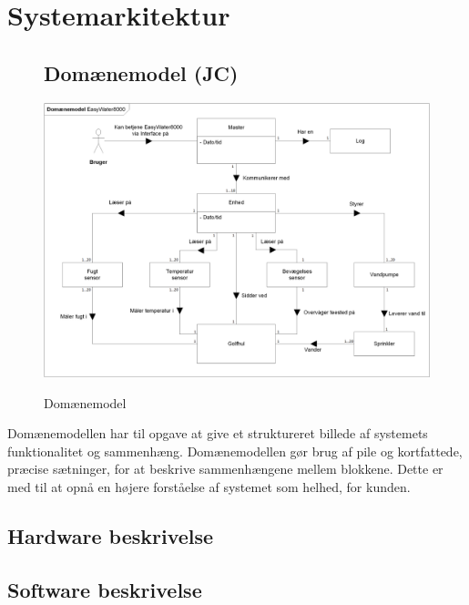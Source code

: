 \chapter{Systemarkitektur}

\begin{figure}[htbp] \centering
\section{Domænemodel (JC)}
{\includegraphics[width=\textwidth]{filer/systemarkitektur/Domainmodel}}
\caption{Domænemodel}
\label{lab:domainmodel}
\end{figure}
Domænemodellen har til opgave at give et struktureret billede af systemets funktionalitet og sammenhæng. Domænemodellen gør brug af pile og kortfattede, præcise sætninger, for at beskrive sammenhængene mellem blokkene. Dette er med til at opnå en højere forståelse af systemet som helhed, for kunden.

\newpage
\section{Hardware beskrivelse}


\clearpage
\section{Software beskrivelse}
